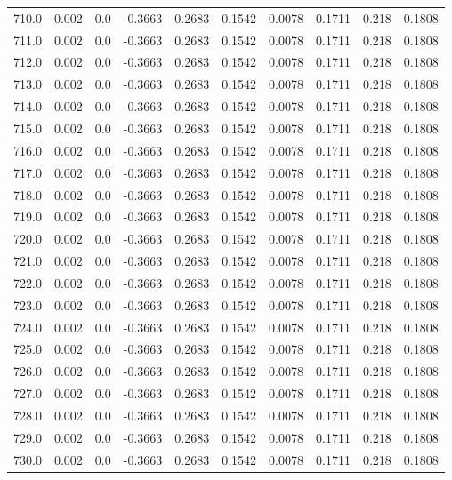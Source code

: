 \begin{longtable}{lrrrrrrrrr}
710.0 & 0.002 & 0.0 & -0.3663 & 0.2683 & 0.1542 & 0.0078 & 0.1711 & 0.218 & 0.1808 \\
711.0 & 0.002 & 0.0 & -0.3663 & 0.2683 & 0.1542 & 0.0078 & 0.1711 & 0.218 & 0.1808 \\
712.0 & 0.002 & 0.0 & -0.3663 & 0.2683 & 0.1542 & 0.0078 & 0.1711 & 0.218 & 0.1808 \\
713.0 & 0.002 & 0.0 & -0.3663 & 0.2683 & 0.1542 & 0.0078 & 0.1711 & 0.218 & 0.1808 \\
714.0 & 0.002 & 0.0 & -0.3663 & 0.2683 & 0.1542 & 0.0078 & 0.1711 & 0.218 & 0.1808 \\
715.0 & 0.002 & 0.0 & -0.3663 & 0.2683 & 0.1542 & 0.0078 & 0.1711 & 0.218 & 0.1808 \\
716.0 & 0.002 & 0.0 & -0.3663 & 0.2683 & 0.1542 & 0.0078 & 0.1711 & 0.218 & 0.1808 \\
717.0 & 0.002 & 0.0 & -0.3663 & 0.2683 & 0.1542 & 0.0078 & 0.1711 & 0.218 & 0.1808 \\
718.0 & 0.002 & 0.0 & -0.3663 & 0.2683 & 0.1542 & 0.0078 & 0.1711 & 0.218 & 0.1808 \\
719.0 & 0.002 & 0.0 & -0.3663 & 0.2683 & 0.1542 & 0.0078 & 0.1711 & 0.218 & 0.1808 \\
720.0 & 0.002 & 0.0 & -0.3663 & 0.2683 & 0.1542 & 0.0078 & 0.1711 & 0.218 & 0.1808 \\
721.0 & 0.002 & 0.0 & -0.3663 & 0.2683 & 0.1542 & 0.0078 & 0.1711 & 0.218 & 0.1808 \\
722.0 & 0.002 & 0.0 & -0.3663 & 0.2683 & 0.1542 & 0.0078 & 0.1711 & 0.218 & 0.1808 \\
723.0 & 0.002 & 0.0 & -0.3663 & 0.2683 & 0.1542 & 0.0078 & 0.1711 & 0.218 & 0.1808 \\
724.0 & 0.002 & 0.0 & -0.3663 & 0.2683 & 0.1542 & 0.0078 & 0.1711 & 0.218 & 0.1808 \\
725.0 & 0.002 & 0.0 & -0.3663 & 0.2683 & 0.1542 & 0.0078 & 0.1711 & 0.218 & 0.1808 \\
726.0 & 0.002 & 0.0 & -0.3663 & 0.2683 & 0.1542 & 0.0078 & 0.1711 & 0.218 & 0.1808 \\
727.0 & 0.002 & 0.0 & -0.3663 & 0.2683 & 0.1542 & 0.0078 & 0.1711 & 0.218 & 0.1808 \\
728.0 & 0.002 & 0.0 & -0.3663 & 0.2683 & 0.1542 & 0.0078 & 0.1711 & 0.218 & 0.1808 \\
729.0 & 0.002 & 0.0 & -0.3663 & 0.2683 & 0.1542 & 0.0078 & 0.1711 & 0.218 & 0.1808 \\
730.0 & 0.002 & 0.0 & -0.3663 & 0.2683 & 0.1542 & 0.0078 & 0.1711 & 0.218 & 0.1808 \\

\end{longtable}
